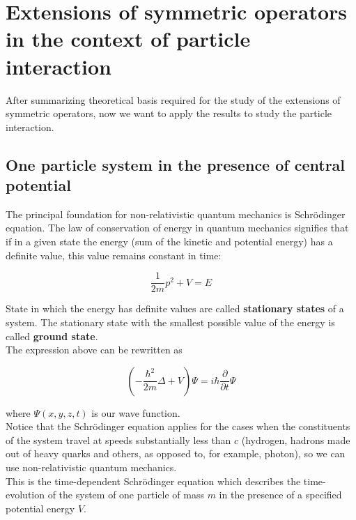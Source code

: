 \documentclass[11pt, a4paper, german]{article}
\theoremstyle{plain}
\theoremstyle{definition}
\theoremstyle{remark}
\numberwithin{equation}{section}
\numberwithin{theorem}{section}
\begin{document}
\section{Extensions of symmetric operators in the context of particle interaction}

After summarizing theoretical basis required for the study of the extensions of symmetric operators, now we want to apply the results to study the particle interaction.

\subsection{One particle system in the presence of central potential}

The principal foundation for non-relativistic quantum mechanics is Schrödinger equation. The law of conservation of energy in quantum mechanics signifies that if in a given state the energy (sum of the kinetic and potential energy) has a definite value, this value remains constant in time:

\begin{equation} \label{eq:energy}
\frac{1}{2m} p^2 + V = E
\end{equation}

State in which the energy has definite values are called \textbf{stationary states} of a system. The stationary state with the smallest possible value of the energy is called \textbf{ground state}.\\

The expression above can be rewritten as 

\begin{equation} \label{eq:schroedinger}
\left(- \frac{\hbar^2}{2m}\Delta + V\right)\Psi = i\hbar \frac{\partial}{\partial t} \Psi
\end{equation}

where $\Psi(x,y,z,t)$ is our wave function.\\

Notice that the Schrödinger equation applies for the cases when the constituents of the system travel at speeds substantially less than $c$ (hydrogen, hadrons made out of heavy quarks and others, as opposed to, for example, photon), so we can use non-relativistic quantum mechanics.\\

This is the time-dependent Schrödinger equation which describes the time-evolution of the system of one particle of mass $m$ in the presence of a specified potential energy $V$.\\
\end{document}
